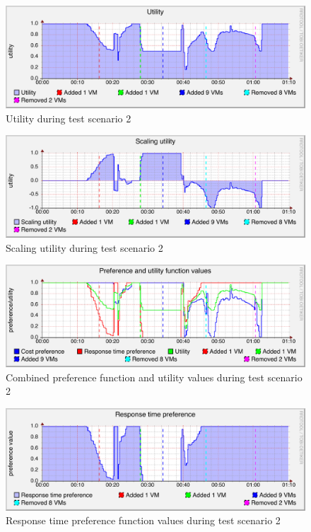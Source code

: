 \documentclass[english]{tktltiki2}
\theoremstyle{definition}
\theoremstyle{remark}
\begin{document}
\begin{figure}[htbp]
	\includegraphics[width=\textwidth]{images/utilitygraph-test23}
	\caption{Utility during test scenario 2}
	\label{fig:utilityScenario2}
\end{figure}

\begin{figure}[htbp]
	\includegraphics[width=\textwidth]{images/scalingutilitygraph-test23}
	\caption{Scaling utility during test scenario 2}
	\label{fig:scalingUtilityScenario2}
\end{figure}

\begin{figure}[htbp]
	\includegraphics[width=\textwidth]{images/preferencesgraph-test23}
	\caption{Combined preference function and utility values during test scenario 2}
	\label{fig:preferencesScenario2}
\end{figure}

\begin{figure}[htbp]
	\includegraphics[width=\textwidth]{images/responsetimepreferencegraph-test23}
	\caption{Response time preference function values during test scenario 2}
	\label{fig:responseTimePreferenceScenario2}
\end{figure}
\end{document}
